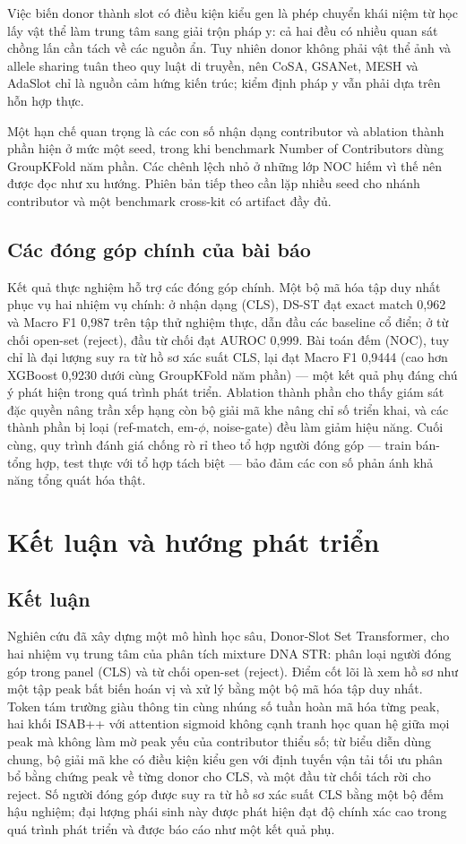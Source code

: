 \documentclass[12pt,a4paper]{article}
\begin{document}
Việc biến donor thành slot có điều kiện kiểu gen là phép chuyển khái niệm từ học lấy vật thể làm trung tâm sang giải trộn pháp y: cả hai đều có nhiều quan sát chồng lấn cần tách về các nguồn ẩn. Tuy nhiên donor không phải vật thể ảnh và allele sharing tuân theo quy luật di truyền, nên CoSA, GSANet, MESH và AdaSlot chỉ là nguồn cảm hứng kiến trúc; kiểm định pháp y vẫn phải dựa trên hỗn hợp thực.

Một hạn chế quan trọng là các con số nhận dạng contributor và ablation thành phần hiện ở mức một seed, trong khi benchmark Number of Contributors dùng GroupKFold năm phần. Các chênh lệch nhỏ ở những lớp NOC hiếm vì thế nên được đọc như xu hướng. Phiên bản tiếp theo cần lặp nhiều seed cho nhánh contributor và một benchmark cross-kit có artifact đầy đủ.

\subsection{Các đóng góp chính của bài báo}

Kết quả thực nghiệm hỗ trợ các đóng góp chính. Một bộ mã hóa tập duy nhất phục vụ hai nhiệm vụ chính: ở nhận dạng (CLS), DS-ST đạt exact match 0,962 và Macro F1 0,987 trên tập thử nghiệm thực, dẫn đầu các baseline cổ điển; ở từ chối open-set (reject), đầu từ chối đạt AUROC 0,999. Bài toán đếm (NOC), tuy chỉ là đại lượng suy ra từ hồ sơ xác suất CLS, lại đạt Macro F1 0,9444 (cao hơn XGBoost 0,9230 dưới cùng GroupKFold năm phần) — một kết quả phụ đáng chú ý phát hiện trong quá trình phát triển. Ablation thành phần cho thấy giám sát đặc quyền nâng trần xếp hạng còn bộ giải mã khe nâng chỉ số triển khai, và các thành phần bị loại (ref-match, em-\(\phi\), noise-gate) đều làm giảm hiệu năng. Cuối cùng, quy trình đánh giá chống rò rỉ theo tổ hợp người đóng góp — train bán-tổng hợp, test thực với tổ hợp tách biệt — bảo đảm các con số phản ánh khả năng tổng quát hóa thật.

\section{Kết luận và hướng phát triển}

\subsection{Kết luận}

Nghiên cứu đã xây dựng một mô hình học sâu, Donor-Slot Set Transformer, cho hai nhiệm vụ trung tâm của phân tích mixture DNA STR: phân loại người đóng góp trong panel (CLS) và từ chối open-set (reject). Điểm cốt lõi là xem hồ sơ như một tập peak bất biến hoán vị và xử lý bằng một bộ mã hóa tập duy nhất. Token tám trường giàu thông tin cùng nhúng số tuần hoàn mã hóa từng peak, hai khối ISAB++ với attention sigmoid không cạnh tranh học quan hệ giữa mọi peak mà không làm mờ peak yếu của contributor thiểu số; từ biểu diễn dùng chung, bộ giải mã khe có điều kiện kiểu gen với định tuyến vận tải tối ưu phân bổ bằng chứng peak về từng donor cho CLS, và một đầu từ chối tách rời cho reject. Số người đóng góp được suy ra từ hồ sơ xác suất CLS bằng một bộ đếm hậu nghiệm; đại lượng phái sinh này được phát hiện đạt độ chính xác cao trong quá trình phát triển và được báo cáo như một kết quả phụ.
\end{document}
